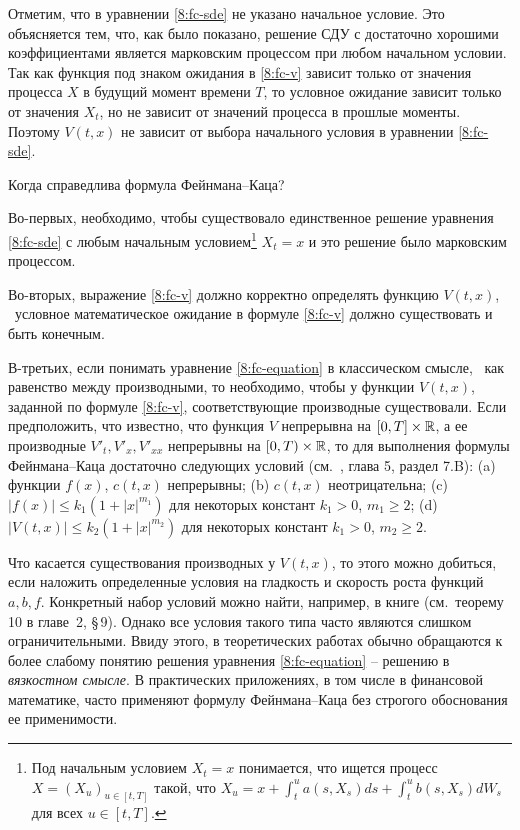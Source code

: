 \begin{remark}
Отметим, что в уравнении \eqref{8:fc-sde} не указано начальное условие.
Это объясняется тем, что, как было показано, решение СДУ с достаточно хорошими коэффициентами является марковским процессом при любом начальном условии.
Так как функция под знаком ожидания в \eqref{8:fc-v} зависит только от значения процесса $X$ в будущий момент времени $T$, то условное ожидание зависит только от значения $X_t$, но не зависит от значений процесса в прошлые моменты.
Поэтому $V(t,x)$ не зависит от выбора начального условия в уравнении \eqref{8:fc-sde}.
\end{remark}

\begin{remark}
\label{8:r:feynman-kac}
Когда справедлива формула Фейнмана--Каца? 

Во-первых, необходимо, чтобы существовало единственное решение уравнения \eqref{8:fc-sde} с любым начальным условием\footnote{
Под начальным условием $X_t=x$ понимается, что ищется процесс $X=(X_u)_{u\in[t,T]}$ такой, что $X_u = x + \int_t^u a(s,X_s) ds + \int_t^u b(s,X_s) dW_s$ для всех $u\in[t,T]$.}
$X_t=x$ и это решение было марковским процессом.

Во-вторых, выражение \eqref{8:fc-v} должно корректно определять функцию $V(t,x)$, \te\ условное математическое ожидание в формуле \eqref{8:fc-v} должно существовать и быть конечным.

В-третьих, если понимать уравнение \eqref{8:fc-equation} в классическом смысле, \te\ как равенство между производными, то необходимо, чтобы у функции $V(t,x)$, заданной по формуле \eqref{8:fc-v}, соответствующие производные существовали.
Если предположить, что известно, что функция $V$ непрерывна на $[0,T]\times\mathbb{R}$, а ее производные $V'_t,V'_x,V'_{xx}$ непрерывны на $[0,T)\times\mathbb{R}$, то для выполнения формулы Фейнмана--Каца достаточно следующих условий (см.\ \cite{KaratzasShreve91}, глава 5, раздел 7.B):
(a) функции $f(x)$, $c(t,x)$ непрерывны;
(b) $c(t,x)$ неотрицательна;
(c) $|f(x)| \le k_1(1+|x|^{m_1})$ для некоторых констант $k_1>0$, $m_1\ge 2$;
(d) $|V(t,x)| \le k_2 (1+|x|^{m_2})$ для некоторых констант $k_1>0$, $m_2\ge 2$.

Что касается существования производных у $V(t,x)$, то этого можно добиться, если наложить определенные условия на гладкость и скорость роста функций $a,b,f$.
Конкретный набор условий можно найти, например, в книге \cite{Krylov80} (см.~теорему 10 в главе~2, \S\,9). Однако все условия такого типа часто являются слишком ограничительными. 
Ввиду этого, в теоретических работах обычно обращаются к более слабому понятию решения уравнения \eqref{8:fc-equation} -- решению в \emph{вязкостном смысле}. В практических приложениях, в том числе в финансовой математике, часто применяют формулу Фейнмана--Каца без строгого обоснования ее применимости.
\end{remark}

